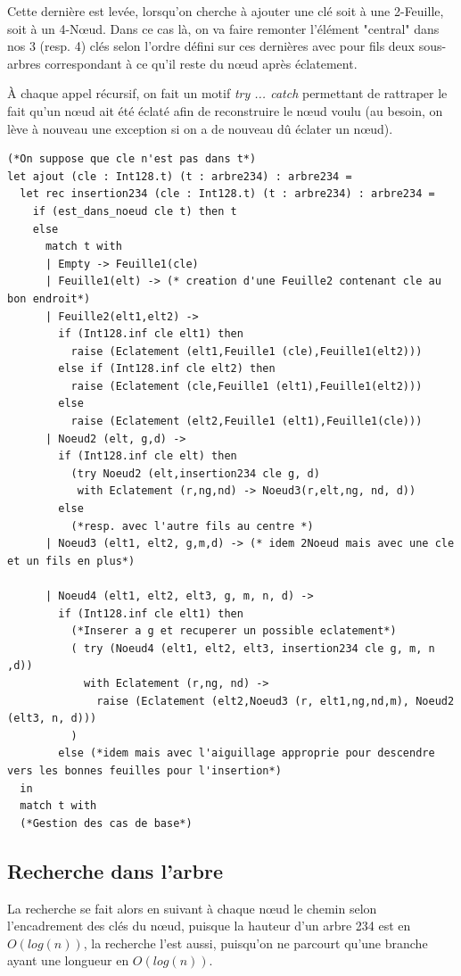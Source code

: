 \documentclass[12pt,a4paper]{article}
\begin{document}
Cette dernière est levée,  lorsqu'on cherche à ajouter une clé soit à une 2-Feuille, soit à un 4-Nœud. Dans ce cas là, on va faire remonter l'élément "central" dans nos 3 (resp. 4) clés selon l'ordre défini sur ces dernières avec pour fils deux sous-arbres correspondant à ce qu'il reste du nœud après éclatement.

À chaque appel récursif, on fait un motif \textit{try ... catch} permettant de rattraper le fait qu'un nœud ait été éclaté afin de reconstruire le nœud voulu (au besoin, on lève à nouveau une exception si on a de nouveau dû éclater un nœud).

\bigskip \begin{lstlisting}
(*On suppose que cle n'est pas dans t*)
let ajout (cle : Int128.t) (t : arbre234) : arbre234 = 
  let rec insertion234 (cle : Int128.t) (t : arbre234) : arbre234 = 
    if (est_dans_noeud cle t) then t 
    else
      match t with 
      | Empty -> Feuille1(cle)
      | Feuille1(elt) -> (* creation d'une Feuille2 contenant cle au bon endroit*)
      | Feuille2(elt1,elt2) -> 
        if (Int128.inf cle elt1) then 
          raise (Eclatement (elt1,Feuille1 (cle),Feuille1(elt2)))
        else if (Int128.inf cle elt2) then 
          raise (Eclatement (cle,Feuille1 (elt1),Feuille1(elt2))) 
        else 
          raise (Eclatement (elt2,Feuille1 (elt1),Feuille1(cle))) 
      | Noeud2 (elt, g,d) ->  
        if (Int128.inf cle elt) then 
          (try Noeud2 (elt,insertion234 cle g, d)
           with Eclatement (r,ng,nd) -> Noeud3(r,elt,ng, nd, d))
        else 
          (*resp. avec l'autre fils au centre *)
      | Noeud3 (elt1, elt2, g,m,d) -> (* idem 2Noeud mais avec une cle et un fils en plus*)

      | Noeud4 (elt1, elt2, elt3, g, m, n, d) ->
        if (Int128.inf cle elt1) then 
          (*Inserer a g et recuperer un possible eclatement*)
          ( try (Noeud4 (elt1, elt2, elt3, insertion234 cle g, m, n ,d))
            with Eclatement (r,ng, nd) -> 
              raise (Eclatement (elt2,Noeud3 (r, elt1,ng,nd,m), Noeud2 (elt3, n, d)))
          )
        else (*idem mais avec l'aiguillage approprie pour descendre vers les bonnes feuilles pour l'insertion*)
  in 
  match t with 
  (*Gestion des cas de base*)
\end{lstlisting} \bigskip

\subsection{Recherche dans l'arbre}
La recherche se fait alors en suivant à chaque nœud le chemin selon l'encadrement des clés du nœud, puisque la hauteur d'un arbre 234 est en $O(log(n))$, la recherche l'est aussi, puisqu'on ne parcourt qu'une branche ayant une longueur en $O(log (n))$.
\end{document}

